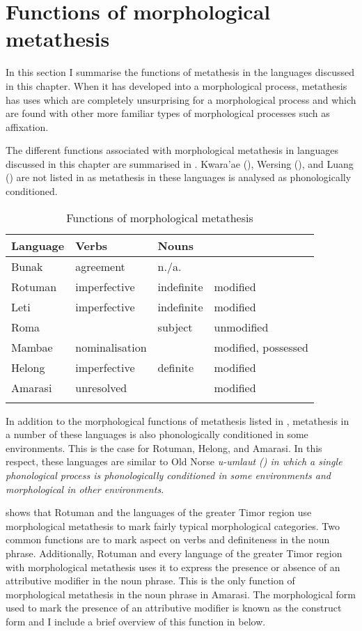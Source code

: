 \section{Functions of morphological metathesis}\label{sec:FunMorMet}
In this section I summarise the functions of metathesis
in the languages discussed in this chapter.
When it has developed into a morphological process,
metathesis has uses which are completely unsurprising for
a morphological process and which are found with other
more familiar types of morphological processes such as affixation.

The different functions associated with morphological metathesis
in languages discussed in this chapter are summarised in .
Kwara'ae (), Wersing (), and Luang ()
are not listed in 
as metathesis in these languages is analysed as phonologically conditioned.

\begin{table}[h]
	\caption{Functions of morphological metathesis}\label{tab:FunMorMet}
		\centering
			\begin{tabular}{llll}\lsptoprule
				Language	&Verbs					&Nouns 			& 					\\ \midrule
				Bunak			&agreement			&n./a.			&					 	\\
				Rotuman		&imperfective		&indefinite	&modified 	\\
				Leti			&imperfective		&indefinite	&modified 	\\
				Roma			&								&subject		&unmodified \\
				Mambae		&nominalisation	&						&modified, possessed\\
				Helong		&imperfective		&definite		&modified 	\\
				Amarasi		&unresolved			&						&modified 	\\\lspbottomrule
			\end{tabular}
\end{table}

In addition to the morphological functions of metathesis
listed in , metathesis in a number
of these languages is also phonologically conditioned in some environments.
This is the case for Rotuman, Helong, and Amarasi.
In this respect, these languages are similar to Old Norse \it{u}-umlaut ()
in which a single phonological process is phonologically conditioned in
some environments and morphological in other environments.

 shows that Rotuman
and the languages of the greater Timor region
use morphological metathesis to mark
fairly typical morphological categories.
Two common functions are to mark aspect on verbs
and definiteness in the noun phrase.
Additionally, Rotuman and every language of the greater Timor region
with morphological metathesis uses
it to express the presence or absence of an attributive modifier in the noun phrase.
This is the only function of morphological metathesis in the noun phrase in Amarasi.
The morphological form used to mark the presence of an attributive modifier
is known as the construct form and I include a brief overview
of this function in  below.

